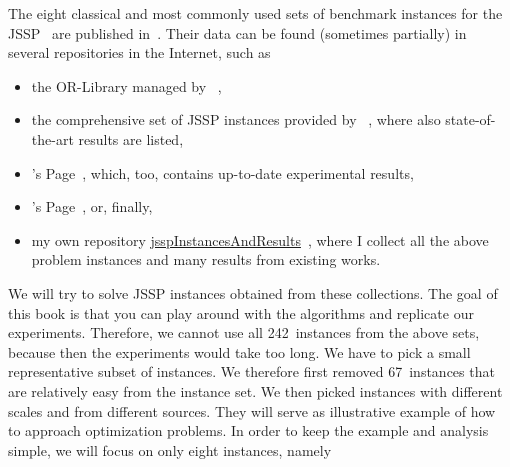 The eight classical and most commonly used sets of benchmark instances for the \gls{JSSP}~\cite{H2002PJSSP} are published in~\cite{FT1963PLCOLJSSR,ABZ1988TSBPFJSS,AC1991ACSOTJSSP,SWV1992NSSFSPWATJSS,YN1992AGAATLSJSI,L1998RCPSAEIOHSTS,DMU1998BFSSP,T1993BFBSP}.
Their data can be found (sometimes partially) in several repositories in the Internet, such as%
%
\begin{itemize}%
%
\item the OR\nobreakdash-Library managed by ~\cite{B1990OLDTPBEM},%
%
\item the comprehensive set of \gls{JSSP} instances provided by ~\cite{vH2015JSIAS,vH2018TCSOBOBIOTJSSP}, where also state-of-the-art results are listed,%
%
\item {}'s Page~\cite{S2019JSSPH}, which, too, contains up-to-date experimental results,%
%
\item {}'s Page~\cite{T1993SI}, or, finally,%
%
\item my own repository \href{http://github.com/thomasWeise/jsspInstancesAndResults}{jsspInstancesAndResults}~\cite{W2019JRDAIOTJSSP}, where I collect all the above problem instances and many results from existing works.%
%
\end{itemize}%
%
We will try to solve \gls{JSSP} instances obtained from these collections.
The goal of this book is that you can play around with the algorithms and replicate our experiments.
Therefore, we cannot use all 242~instances from the above sets, because then the experiments would take too long.
We have to pick a small representative subset of instances.
We therefore first removed 67~instances that are relatively easy from the instance set.
We then picked instances with different scales and from different sources.
They will serve as illustrative example of how to approach optimization problems.
In order to keep the example and analysis simple, we will focus on only eight instances, namely%
%
